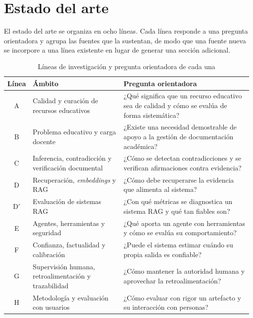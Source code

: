 \section{Estado del arte}
\label{sec:estado-arte}

El estado del arte se organiza en ocho líneas. Cada línea responde a una pregunta
orientadora y agrupa las fuentes que la sustentan, de modo que una fuente nueva se
incorpore a una línea existente en lugar de generar una sección adicional.

\begin{table}[H]
\centering
\small
\caption{Líneas de investigación y pregunta orientadora de cada una}
\label{tab:lineas}
\begin{tabularx}{\textwidth}{@{}c L{4.2cm} X@{}}
\toprule
\textbf{Línea} & \textbf{Ámbito} & \textbf{Pregunta orientadora} \\
\midrule
A & Calidad y curación de recursos educativos &
¿Qué significa que un recurso educativo sea de calidad y cómo se evalúa de forma
sistemática? \\
B & Problema educativo y carga docente &
¿Existe una necesidad demostrable de apoyo a la gestión de documentación académica? \\
C & Inferencia, contradicción y verificación documental &
¿Cómo se detectan contradicciones y se verifican afirmaciones contra evidencia? \\
D & Recuperación, \emph{embeddings} y RAG &
¿Cómo debe recuperarse la evidencia que alimenta al sistema? \\
D$'$ & Evaluación de sistemas RAG &
¿Con qué métricas se diagnostica un sistema RAG y qué tan fiables son? \\
E & Agentes, herramientas y seguridad &
¿Qué aporta un agente con herramientas y cómo se evalúa su comportamiento? \\
F & Confianza, factualidad y calibración &
¿Puede el sistema estimar cuándo su propia salida es confiable? \\
G & Supervisión humana, retroalimentación y trazabilidad &
¿Cómo mantener la autoridad humana y aprovechar la retroalimentación? \\
H & Metodología y evaluación con usuarios &
¿Cómo evaluar con rigor un artefacto y su interacción con personas? \\
\bottomrule
\end{tabularx}
\end{table}

